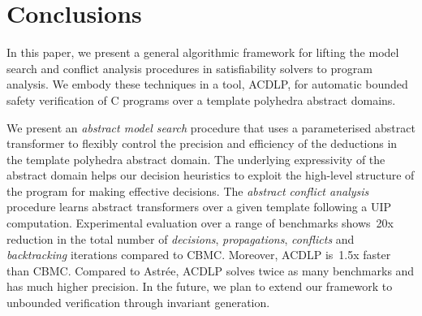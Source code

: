 \section{Conclusions}

In this paper, we present a general algorithmic framework for lifting the
model search and conflict analysis procedures in satisfiability solvers to
program analysis.  We embody these techniques in a tool, ACDLP, for
automatic bounded safety verification of C programs over a template
polyhedra abstract domains.

We present an {\em abstract model search} procedure that uses a
parameterised abstract transformer to flexibly control the precision and
efficiency of the deductions in the template polyhedra abstract domain.  The
underlying expressivity of the abstract domain helps our decision heuristics
to exploit the high-level structure of the program for making effective
decisions.  The {\em abstract conflict analysis} procedure learns abstract
transformers over a given template following a UIP computation. 
Experimental evaluation over a range of benchmarks shows~20x reduction in
the total number of {\em decisions}, {\em propagations}, {\em conflicts} and
{\em backtracking} iterations compared to CBMC.  Moreover, ACDLP is~1.5x
faster than CBMC.  Compared to Astr{\'e}e, ACDLP solves twice as many
benchmarks and has much higher precision.  In the future, we plan to extend
our framework to unbounded verification through invariant generation.


